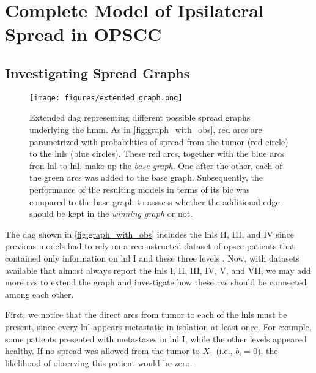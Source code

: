 \documentclass[twocolumn]{aastex631}
\begin{document}
\section{Complete Model of Ipsilateral Spread in OPSCC}
\label{sec:complete_model}


\subsection{Investigating Spread Graphs}
\label{subsec:complete_model:graphs}

\begin{figure}
    \centering
    \texttt{[image: figures/extended\_graph.png]}
    \caption{Extended \gls{dag} representing different possible spread graphs underlying the \gls{hmm}. As in \cref{fig:graph_with_obs}, red arcs are parametrized with probabilities of spread from the tumor (red circle) to the \glspl{lnl} (blue circles). These red arcs, together with the blue arcs fron \gls{lnl} to \gls{lnl}, make up the \emph{base graph}. One after the other, each of the green arcs was added to the base graph. Subsequently, the performance of the resulting models in terms of its \gls{bic} was compared to the base graph to asssess whether the additional edge should be kept in the \emph{winning graph} or not.}
    \label{fig:extended_graph}
\end{figure}

The \gls{dag} shown in \cref{fig:graph_with_obs} includes the \glspl{lnl} II, III, and IV since previous models \cite{pouymayou_bayesian_2019,ludwig_hidden_2021} had to rely on a reconstructed dataset of \gls{opscc} patients that contained only information on \gls{lnl} I and these three levels \cite{sanguineti_defining_2009}. Now, with datasets available that almost always report the \glspl{lnl} I, II, III, IV, V, and VII, we may add more \glspl{rv} to extend the graph and investigate how these \glspl{rv} should be connected among each other.

First, we notice that the direct arcs from tumor to each of the \glspl{lnl} must be present, since every \gls{lnl} appears metastatic in isolation at least once. For example, some patients presented with metastases in \gls{lnl} I, while the other levels appeared healthy. If no spread was allowed from the tumor to $X_1$ (i.e., $b_i = 0$), the likelihood of observing this patient would be zero.
\end{document}
